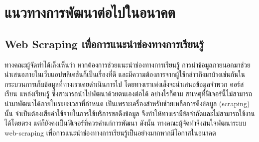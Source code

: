 \section{แนวทางการพัฒนาต่อไปในอนาคต}
\subsection{Web Scraping เพื่อการแนะนำช่องทางการเรียนรู้}
\par{
    ทางคณะผู้จัดทำได้เล็งเห็นว่า หากต้องการช่วยแนะนำช่องทางการเรียนรู้ การนำข้อมูลภายนอกมาช่วยนำเสนอภายในเว็บแอปพลิเคชันก็เป็นเรื่องที่ดี และมีความต้องการจากผู้ใช้กล่าวถึงมาบ้างเช่นกันในกระบวนการเก็บข้อมูลที่ทางเราเคยดำเนินการไป
    โดยทางเราเพ่งเล็งจะนำเสนอข้อมูลจำพวก คอร์สเรียน แหล่งเรียนรู้ ซึ่งสามารถนำไปพัฒนาด้วยตนเองต่อได้ อย่างไรก็ตาม สาเหตุที่ฟีเจอร์นี้ไม่สามารถนำมาพัฒนาได้ภายในระยะเวลาที่กำหนด
    เป็นเพราะเครื่องสำหรับช่วยเหลือการดึงข้อมูล (scraping) นั้น จำเป็นต้องเสียค่าใช้จ่ายในการใช้บริการขอดึงข้อมูล จึงทำให้ทางเรามีข้อจำกัดและไม่สามารถใช้งานได้โดยตรง แต่ก็ยังคงเป็นฟีเจอร์ที่ควรค่าแก่การพัฒนา ดังนั้น
    ทางคณะผู้จัดทำจึงสนใจพัฒนาระบบ web-scraping เพื่อการแนะนำช่องทางการเรียนรู้เป็นอย่างมากหากมีโอกาสในอนาคต
}